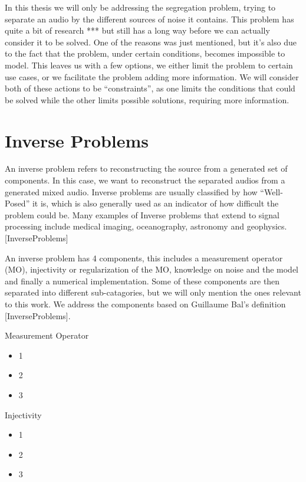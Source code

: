 \documentclass{book}
\begin{document}
\par
In this thesis we will only be addressing the segregation problem, trying to separate an audio by the different sources of noise it contains. This problem has quite a bit of research *** but still has a long way before we can actually consider it to be solved. One of the reasons was just mentioned, but it’s also due to the fact that the problem, under certain conditions, becomes impossible to model. This leaves us with a few options, we either limit the problem to certain use cases, or we facilitate the problem adding more information. We will consider both of these actions to be “constraints”, as one limits the conditions that could be solved while the other limits possible solutions, requiring more information.

\section{Inverse Problems}

\qquad An inverse problem refers to reconstructing the source from a generated set of components. In this case, we want to reconstruct the separated audios from a generated mixed audio. Inverse problems are usually classified by how “Well-Posed” it is, which is also generally used as an indicator of how difficult the problem could be. Many examples of Inverse problems that extend to signal processing include medical imaging, oceanography, astronomy and geophysics. [InverseProblems]
\par
An inverse problem has 4 components, this includes a measurement operator (MO), injectivity or regularization of the MO, knowledge on noise and the model and finally a numerical implementation. Some of these components are then separated into different sub-catagories, but we will only mention the ones relevant to this work. We address the components based on Guillaume Bal’s definition [InverseProblems].

\begin{center}
\noindent Measurement Operator
\end{center}
\begin{itemize}
    \item 1
    \item 2
    \item 3
\end{itemize}

\begin{center}
\noindent Injectivity
\end{center}
\begin{itemize}
    \item 1
    \item 2
    \item 3
\end{itemize}
\end{document}
